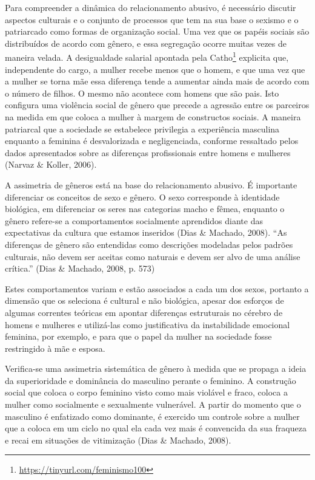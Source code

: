 Para compreender a dinâmica do relacionamento abusivo, é necessário discutir aspectos culturais e o conjunto de processos que tem na sua base o sexismo e o patriarcado como formas de organização social. Uma vez que os papéis sociais são distribuídos de acordo com gênero, e essa segregação ocorre muitas vezes de maneira velada. A desigualdade salarial apontada pela Catho\footnote{\url{https://tinyurl.com/feminismo100}} explicita que, independente do cargo, a mulher recebe menos que o homem, e que uma vez que a mulher se torna mãe essa diferença tende a aumentar ainda mais de acordo com o número de filhos. O mesmo não acontece com homens que são pais. Isto configura uma violência social de gênero que precede a agressão entre os parceiros na medida em que coloca a mulher à margem de constructos sociais. A maneira patriarcal que a sociedade se estabelece privilegia a experiência masculina enquanto a feminina é desvalorizada e negligenciada, conforme ressaltado pelos dados apresentados sobre as diferenças profissionais entre homens e mulheres (Narvaz \& Koller, 2006).

A assimetria de gêneros está na base do relacionamento abusivo. É importante diferenciar os conceitos de sexo e gênero. O sexo corresponde à identidade biológica, em diferenciar os seres nas categorias macho e fêmea, enquanto o gênero refere-se a comportamentos socialmente aprendidos diante das expectativas da cultura que estamos inseridos (Dias \& Machado, 2008). ``As diferenças de gênero são entendidas como descrições modeladas pelos padrões culturais, não devem ser aceitas como naturais e devem ser alvo de uma análise crítica.'' (Dias \& Machado, 2008, p. 573) 

Estes comportamentos variam e estão associados a cada um dos sexos, portanto a dimensão que os seleciona é cultural e não biológica, apesar dos esforços de algumas correntes teóricas em apontar diferenças estruturais no cérebro de homens e mulheres e utilizá-las como justificativa da instabilidade emocional feminina, por exemplo, e para que o papel da mulher na sociedade fosse restringido à mãe e esposa.

Verifica-se uma assimetria sistemática de gênero à medida que se propaga a ideia da superioridade e dominância do masculino perante o feminino. A construção social que coloca o corpo feminino visto como mais violável e fraco, coloca a mulher como socialmente e sexualmente vulnerável. A partir do momento que o masculino é enfatizado como dominante, é exercido um controle sobre a mulher que a coloca em um ciclo no qual ela cada vez mais é convencida da sua fraqueza e recai em situações de vitimização (Dias \& Machado, 2008).

